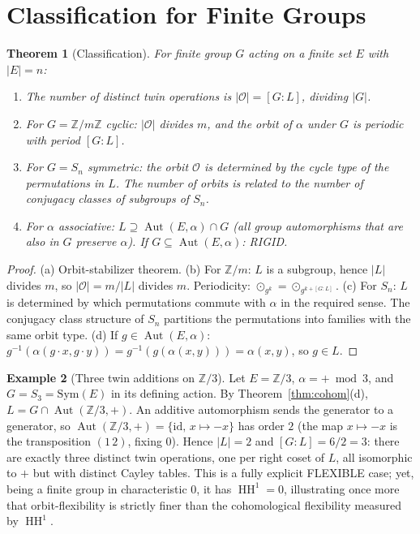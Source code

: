 \documentclass[11pt,twocolumn]{article}
\theoremstyle{plain}\newtheorem{theorem}{Theorem}\newtheorem{proposition}[theorem]{Proposition}\newtheorem{corollary}[theorem]{Corollary}\newtheorem{lemma}[theorem]{Lemma}
\theoremstyle{definition}\newtheorem{definition}[theorem]{Definition}\newtheorem{example}[theorem]{Example}
\theoremstyle{remark}\newtheorem{remark}[theorem]{Remark}
\newcommand{\HH}{\operatorname{HH}}
\newcommand{\Aut}{\operatorname{Aut}}
\begin{document}
\section{Classification for Finite Groups}
\label{sec:classification}

\begin{theorem}[Classification]\label{thm:classification}
For finite group $G$ acting on a finite set $E$ with $|E| = n$:
\begin{enumerate}[label=(\alph*)]
    \item The number of distinct twin operations is $|\mathcal{O}| = [G:L]$, dividing $|G|$.
    \item For $G = \mathbb{Z}/m\mathbb{Z}$ cyclic: $|\mathcal{O}|$ divides $m$, and the orbit of $\alpha$ under $G$ is periodic with period $[G:L]$.
    \item For $G = S_n$ symmetric: the orbit $\mathcal{O}$ is determined by the cycle type of the permutations in $L$. The number of orbits is related to the number of conjugacy classes of subgroups of $S_n$.
    \item For $\alpha$ associative: $L \supseteq \Aut(E, \alpha) \cap G$ (all group automorphisms that are also in $G$ preserve $\alpha$). If $G \subseteq \Aut(E, \alpha)$: RIGID.
\end{enumerate}
\end{theorem}

\begin{proof}
(a) Orbit-stabilizer theorem.
(b) For $\mathbb{Z}/m$: $L$ is a subgroup, hence $|L|$ divides $m$, so $|\mathcal{O}| = m/|L|$ divides $m$. Periodicity: $\odot_{g^{k}} = \odot_{g^{k + [G:L]}}$.
(c) For $S_n$: $L$ is determined by which permutations commute with $\alpha$ in the required sense. The conjugacy class structure of $S_n$ partitions the permutations into families with the same orbit type.
(d) If $g \in \Aut(E, \alpha)$: $g^{-1}(\alpha(g \cdot x, g \cdot y)) = g^{-1}(g(\alpha(x,y))) = \alpha(x,y)$, so $g \in L$.
\end{proof}


\begin{example}[Three twin additions on $\mathbb{Z}/3$]\label{ex:z3-s3}
Let $E=\mathbb{Z}/3$, $\alpha=+\bmod 3$, and $G=S_3=\mathrm{Sym}(E)$ in its defining action. By
Theorem~\ref{thm:cohom}(d), $L=G\cap\Aut(\mathbb{Z}/3,+)$. An additive automorphism sends the generator to a
generator, so $\Aut(\mathbb{Z}/3,+)=\{\mathrm{id},\,x\mapsto -x\}$ has order $2$ (the map $x\mapsto-x$ is the
transposition $(1\,2)$, fixing $0$). Hence $|L|=2$ and $[G:L]=6/2=3$: there are exactly three distinct twin
operations, one per right coset of $L$, all isomorphic to $+$ but with distinct Cayley tables. This is a fully
explicit FLEXIBLE case; yet, being a finite group in characteristic $0$, it has $\HH^1=0$, illustrating once
more that orbit-flexibility is strictly finer than the cohomological flexibility measured by $\HH^1$.
\end{example}
\end{document}
